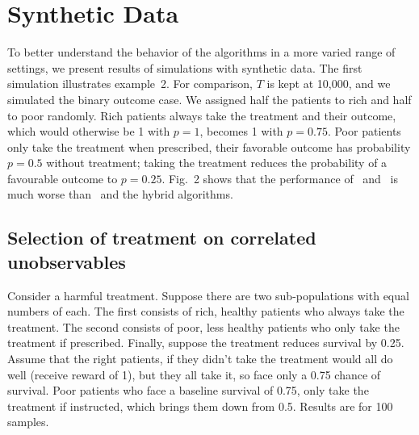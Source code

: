 \section{Synthetic Data}


To better understand the behavior of the algorithms in a more varied range of settings, we present results of simulations with synthetic data.
The first simulation illustrates example~2. For comparison, $T$ is kept at 10,000, and we simulated the binary outcome case. We assigned half the patients to rich and half to poor randomly. Rich patients always take the treatment and their outcome, which would otherwise be 1 with $p=1$, becomes 1 with  $p=0.75$. Poor patients only take the treatment when prescribed, their favorable outcome has probability $p=0.5$ without treatment; taking the treatment reduces the probability of a favourable outcome to $p=0.25$. Fig.~2 shows that the performance of \actual\, and \comply\, is much worse than \chosen\, and the hybrid algorithms.



\subsection{Selection of treatment on correlated unobservables}

Consider a harmful treatment. Suppose there are two sub-populations with equal numbers of each. The first consists of rich, healthy patients who always take the treatment. The second consists of poor, less healthy patients who only take the treatment if prescribed. Finally, suppose the treatment reduces survival by 0.25. Assume that the right patients, if they didn't take the treatment would all do well (receive reward of 1), but they all take it, so face only a 0.75 chance of survival. Poor patients who face a baseline survival of 0.75, only take the treatment if instructed, which brings them down from 0.5. Results are for 100 samples.

%

%


